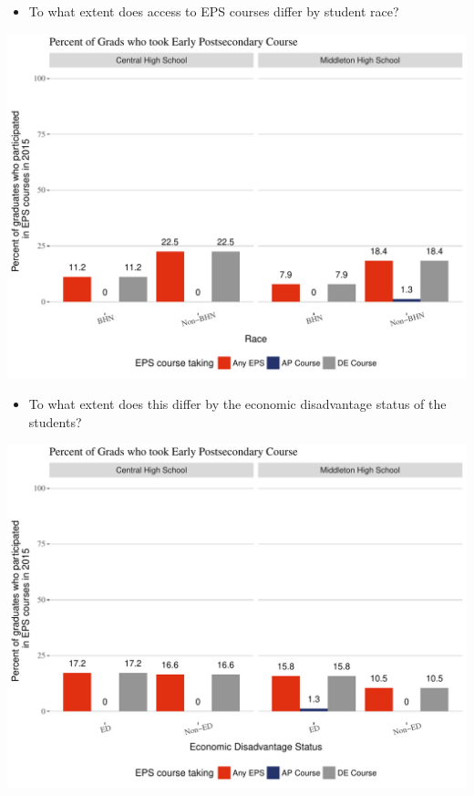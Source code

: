 \documentclass[11pt,]{article}
\providecommand{\tightlist}{%
  \setlength{\itemsep}{0pt}\setlength{\parskip}{0pt}}
\begin{document}
\begin{itemize}
\tightlist
\item
  To what extent does access to EPS courses differ by student race?
\end{itemize}

\includegraphics{20170411_PSWRR_no_CTE_files/figure-latex/Figure9b-1.pdf}

\begin{itemize}
\tightlist
\item
  To what extent does this differ by the economic disadvantage status of
  the students?
\end{itemize}

\includegraphics{20170411_PSWRR_no_CTE_files/figure-latex/Figure9c-1.pdf}
\end{document}
